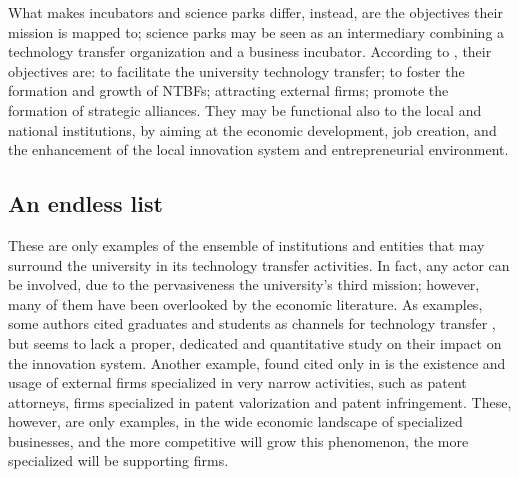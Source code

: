 What makes incubators and science parks differ, instead, are the objectives their mission is mapped to; science parks may be seen as an intermediary combining a technology transfer organization and a business incubator. According to \citet{Siegel2003}, their objectives are: to facilitate the university technology transfer; to foster the formation and growth of NTBFs; attracting external firms; promote the formation of strategic alliances. They may be functional also to the local and national institutions, by aiming at the economic development, job creation, and the enhancement of the local innovation system and entrepreneurial environment. 

\subsection{An endless list}

These are only examples of the ensemble of institutions and entities that may surround the university in its technology transfer activities. In fact, any actor can be involved, due to the pervasiveness the university's third mission; however, many of them have been overlooked by the economic literature. As examples, some authors cited graduates and students as channels for technology transfer \citep{Segal1986, Audretsch2004,OShea2005,Guerrero2014}, but seems to lack a proper, dedicated and quantitative study on their impact on the innovation system. Another example, found cited only in \citet{Balderi2010} is the existence and usage of external firms specialized in very narrow activities, such as patent attorneys, firms specialized in patent valorization and patent infringement. These, however, are only examples, in the wide economic landscape of specialized businesses, and the more competitive will grow this phenomenon, the more specialized will be supporting firms. 
